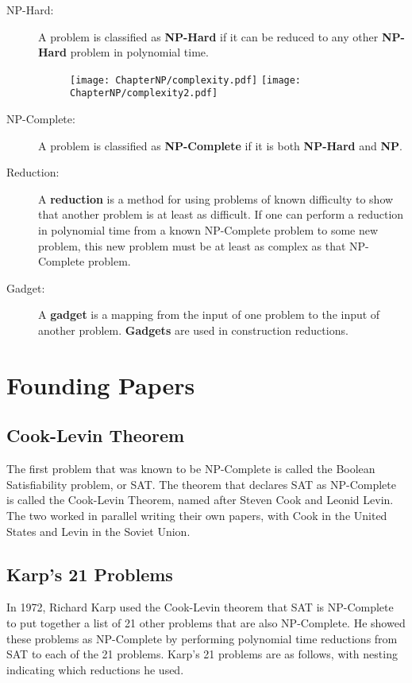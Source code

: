 \begin{description}
    \item[NP-Hard:] A problem is classified as \textbf{NP-Hard} if it can be reduced to any other \textbf{NP-Hard} problem in polynomial time.
    \begin{figure}[H]
        \centering
        \texttt{[image: ChapterNP/complexity.pdf]}
        \texttt{[image: ChapterNP/complexity2.pdf]}
    \end{figure}
    \item[NP-Complete:] A problem is classified as \textbf{NP-Complete} if it is both \textbf{NP-Hard} and \textbf{NP}.
    \item[Reduction:] A \textbf{reduction} is a method for using problems of known difficulty to show that another problem is at least as difficult. If one can perform a reduction in polynomial time from a known NP-Complete problem to some new problem, this new problem must be at least as complex as that NP-Complete problem.
    \item[Gadget:] A \textbf{gadget} is a mapping from the input of one problem to the input of another problem. \textbf{Gadgets} are used in construction reductions.
\end{description}

\section{Founding Papers}
\subsection{Cook-Levin Theorem}
    The first problem that was known to be NP-Complete is called the Boolean Satisfiability problem, or SAT. The theorem that declares SAT as NP-Complete is called the Cook-Levin Theorem, named after Steven Cook and Leonid Levin. The two worked in parallel writing their own papers, with Cook in the United States and Levin in the Soviet Union.  
\subsection{Karp's 21 Problems}
    In 1972, Richard Karp used the Cook-Levin theorem that SAT is NP-Complete to put together a list of 21 other problems that are also NP-Complete. He showed these problems as NP-Complete by performing polynomial time reductions from SAT to each of the 21 problems. Karp's 21 problems are as follows, with nesting indicating which reductions he used.


